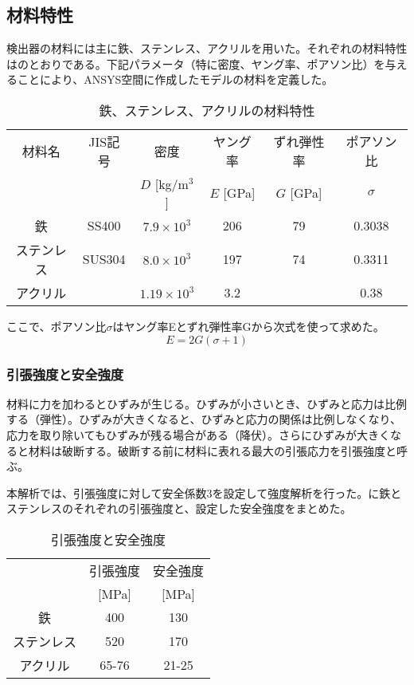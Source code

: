 \subsection{材料特性}
検出器の材料には主に鉄、ステンレス、アクリルを用いた。それぞれの材料特性はのとおりである。下記パラメータ（特に密度、ヤング率、ポアソン比）を与えることにより、ANSYS空間に作成したモデルの材料を定義した。

\begin{table}[htbp]
\caption[鉄、ステンレス、アクリルの材料特性]{鉄、ステンレス、アクリルの材料特性}
\begin{center}
\begin{tabular}{cccccc}
\hline \hline
材料名 & JIS記号 & 密度 & ヤング率 & ずれ弾性率 & ポアソン比\\
& & $D$ [kg/m$^{3}$] & $E$ [GPa] & $G$ [GPa] & $\sigma$\\
 \hline
鉄 & SS400 & $7.9 \times 10^{3}$& 206 & 79 & 0.3038\\
ステンレス & SUS304 & $8.0 \times 10^{3}$ & 197 & 74 & 0.3311\\
アクリル & & $1.19 \times 10^{3}$ & 3.2 & & 0.38\\
\hline \hline
\end{tabular}
\end{center}
\label{MaterialProperty}
\end{table}%

ここで、ポアソン比$\sigma$はヤング率Eとずれ弾性率Gから次式を使って求めた。
\begin{equation}
E = 2G(\sigma+1)
\label{PoissonRatio}
\end{equation}

\subsubsection{引張強度と安全強度}
材料に力を加わるとひずみが生じる。ひずみが小さいとき、ひずみと応力は比例する（弾性）。ひずみが大きくなると、ひずみと応力の関係は比例しなくなり、応力を取り除いてもひずみが残る場合がある（降伏）。さらにひずみが大きくなると材料は破断する。破断する前に材料に表れる最大の引張応力を引張強度と呼ぶ。

本解析では、引張強度に対して安全係数3を設定して強度解析を行った。に鉄とステンレスのそれぞれの引張強度と、設定した安全強度をまとめた。



\begin{table}[htbp]
\caption[引張強度と安全強度]{引張強度と安全強度}
\begin{center}
\begin{tabular}{ccc}
\hline \hline
& 引張強度 & 安全強度\\
& [MPa] & [MPa] \\
\hline
鉄 & 400 & 130\\
ステンレス & 520 & 170\\
アクリル & 65-76 & 21-25\\
\hline \hline
\end{tabular}
\end{center}
\label{SafeStress}
\end{table}%


